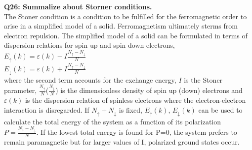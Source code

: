 \documentclass{article}
\begin{document}
\newpage
\noindent \textbf{Q26: Summalize about Storner conditions.}\\
\noindent The Stoner condition is a condition to be fulfilled for the ferromagnetic order to arise in a simplified model of a solid. Ferromagnetism ultimately sterms from electron repulsion. The simplified model of a solid can be formulated in terms of dispersion relations for spin up and spin down electrons,\\
\noindent $E_{\uparrow}(k)=\varepsilon(k)-I\frac{N_{\uparrow}-N_{\downarrow}}{N}$\\
\noindent $E_{\downarrow}(k)=\varepsilon(k)+I\frac{N_{\uparrow}-N_{\downarrow}}{N}$\\
\noindent where the second term accounts for the exchange energy, $I$ is the Stoner parameter, $\frac{N_{\uparrow}}{N}$($\frac{N_{\downarrow}}{N}$) is the dimensionless density of spin up (down) electrons and $\varepsilon(k)$ is the dispersion relation of spinless electrons where the electron-electron interaction is disregarded. If $N_{\uparrow}+N_{\downarrow}$ is fixed, $E_{\uparrow}(k)$, $E_{\downarrow}(k)$ can be used to calculate the total energy of the system as a function of its polarization $P=\frac{N_{\uparrow}-N_{\downarrow}}{N}$. If the lowest total energy is found for P=0, the system prefers to remain paramagnetic but for larger values of I, polarized ground states occur.\\
\end{document}
